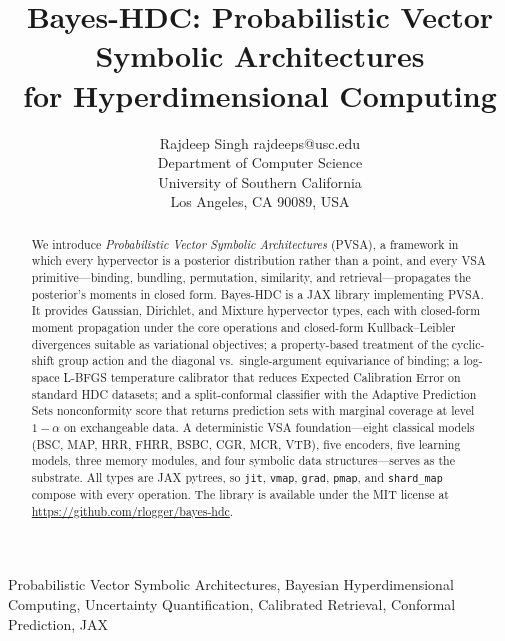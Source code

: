 \documentclass[twoside,11pt]{article}
\begin{document}
\title{Bayes-HDC: Probabilistic Vector Symbolic Architectures \\ for Hyperdimensional Computing}

\author{\name Rajdeep Singh \email rajdeeps@usc.edu \\
       \addr Department of Computer Science\\
       University of Southern California\\
       Los Angeles, CA 90089, USA}

\maketitle

\begin{abstract}
We introduce \emph{Probabilistic Vector Symbolic Architectures} (PVSA), a framework in which every hypervector is a posterior distribution rather than a point, and every VSA primitive---binding, bundling, permutation, similarity, and retrieval---propagates the posterior's moments in closed form. Bayes-HDC is a JAX library implementing PVSA. It provides Gaussian, Dirichlet, and Mixture hypervector types, each with closed-form moment propagation under the core operations and closed-form Kullback--Leibler divergences suitable as variational objectives; a property-based treatment of the cyclic-shift group action and the diagonal vs.\ single-argument equivariance of binding; a log-space L-BFGS temperature calibrator that reduces Expected Calibration Error on standard HDC datasets; and a split-conformal classifier with the Adaptive Prediction Sets nonconformity score that returns prediction sets with marginal coverage at level $1-\alpha$ on exchangeable data. A deterministic VSA foundation---eight classical models (BSC, MAP, HRR, FHRR, BSBC, CGR, MCR, VTB), five encoders, five learning models, three memory modules, and four symbolic data structures---serves as the substrate. All types are JAX pytrees, so \texttt{jit}, \texttt{vmap}, \texttt{grad}, \texttt{pmap}, and \texttt{shard\_map} compose with every operation. The library is available under the MIT license at \url{https://github.com/rlogger/bayes-hdc}.
\end{abstract}

\begin{keywords}
Probabilistic Vector Symbolic Architectures, Bayesian Hyperdimensional Computing, Uncertainty Quantification, Calibrated Retrieval, Conformal Prediction, JAX
\end{keywords}
\end{document}
